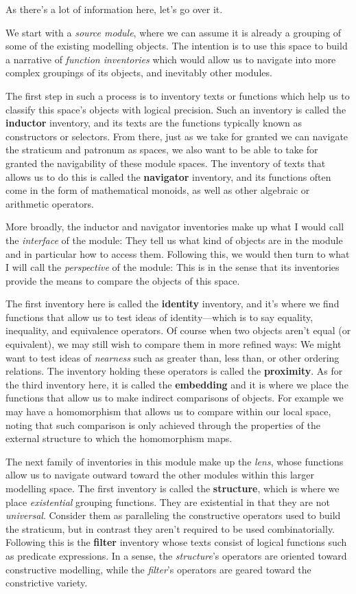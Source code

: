 \documentclass[twoside]{article}
\newcommand{\strong}[1]{{\bfseries #1}}
\begin{document}
As there's a lot of information here, let's go over it.

We start with a \emph{source module}, where we can assume it is already a grouping of some of the existing modelling
objects. The intention is to use this space to build a narrative of \emph{function inventories} which would allow us
to navigate into more complex groupings of its objects, and inevitably other modules.

The first step in such a process is to inventory texts or functions which help us to classify this space's objects with
logical precision. Such an inventory is called the \strong{inductor} inventory, and its texts are the functions typically
known as constructors or selectors. From there, just as we take for granted we can navigate the straticum and patronum
as spaces, we also want to be able to take for granted the navigability of these module spaces. The inventory of texts
that allows us to do this is called the \strong{navigator} inventory, and its functions often come in the form
of mathematical monoids, as well as other algebraic or arithmetic operators.

More broadly, the inductor and navigator inventories make up what I would call the \emph{interface} of the module:
They tell us what kind of objects are in the module and in particular how to access them. Following this, we would
then turn to what I will call the \emph{perspective} of the module: This is in the sense that its inventories
provide the means to compare the objects of this space.

The first inventory here is called the \strong{identity} inventory, and it's where we find functions that allow us to test
ideas of identity---which is to say equality, inequality, and equivalence operators. Of course when two objects aren't equal
(or equivalent), we may still wish to compare them in more refined ways: We might want to test ideas of \emph{nearness} such
as greater than, less than, or other ordering relations. The inventory holding these operators is called the \strong{proximity}.
As for the third inventory here, it is called the \strong{embedding} and it is where we place the functions that allow us to
make indirect comparisons of objects. For example we may have a homomorphism that allows us to compare within our local space,
noting that such comparison is only achieved through the properties of the external structure to which the homomorphism maps.

The next family of inventories in this module make up the \emph{lens}, whose functions allow us to navigate outward
toward the other modules within this larger modelling space. The first inventory is called the \strong{structure}, which
is where we place \emph{existential} grouping functions. They are existential in that they are not \emph{universal}.
Consider them as paralleling the constructive operators used to build the straticum, but in contrast they aren't required
to be used combinatorially. Following this is the \strong{filter} inventory whose texts consist of logical functions
such as predicate expressions. In a sense, the \emph{structure}'s operators are oriented toward constructive modelling,
while the \emph{filter}'s operators are geared toward the constrictive variety.
\end{document}
